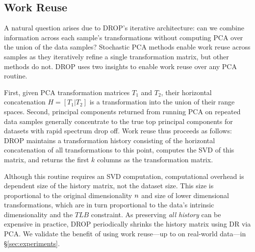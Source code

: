 \subsection{Work Reuse}
\label{subsec:reuse}

A natural question arises due to DROP's iterative architecture: can we combine information across each sample's transformations without computing PCA over the union of the data samples? 
Stochastic PCA methods enable work reuse across samples as they iteratively refine a single transformation matrix, but other methods do not.
DROP uses two insights to enable work reuse over any PCA routine.

First, given PCA transformation matrices $T_1$ and $T_2$, their horizontal concatenation $H = [T_1 | T_2]$ is a transformation into the union of their range spaces.
Second, principal components returned from running PCA on repeated data samples generally concentrate to the true top principal components for datasets with rapid spectrum drop off.
Work reuse thus proceeds as follows:
DROP maintains a transformation history consisting of the horizontal concatenation of all transformations to this point, computes the SVD of this matrix, and returns the first $k$ columns as the transformation matrix. 

Although this routine requires an SVD computation, computational overhead is dependent size of the history matrix, not the dataset size.
This size is proportional to the original dimensionality ${\color{black}n}$ and size of lower dimensional transformations, which are in turn proportional to the data's intrinsic dimensionality and the $TLB$ constraint.
As preserving \emph{all history} can be expensive in practice, 
DROP periodically shrinks the history matrix using DR via PCA. 
We validate the benefit of using work reuse---up to  on real-world data---in \S\ref{sec:experiments}.

